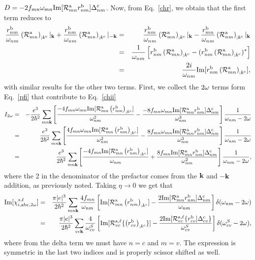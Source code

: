 \documentclass[floatfix,prb,aps,superscriptaddress,11pt,preprint]{revtex4}
\begin{document}
$D=-2f_{mn}\omega_{mn}\mathrm{Im}[{\cal  R}^{\mathrm{a}}_{mn}r^{\mathrm{b}}_{nm}]\Delta^{\mathrm{c}}_{nm}$.
 Now, from Eq.~\eqref{chr}, we obtain
that the first term reduces to
\begin{eqnarray}\label{chrn}
\frac{r^{\mathrm{b}}_{nm}}{\omega_{nm}}\left({\cal R}^{\mathrm{a}}_{mn}\right)_{;k^{\mathrm{c}}}|_{\mathbf{k}}
+
\frac{r^{\mathrm{b}}_{nm}}{\omega_{nm}}\left({\cal R}^{\mathrm{a}}_{mn}\right)_{;k^{\mathrm{c}}}|_{-\mathbf{k}}
&=&
\frac{r^{\mathrm{b}}_{nm}}{\omega_{nm}}\left({\cal R}^{\mathrm{a}}_{mn}\right)_{;k^{\mathrm{c}}}|_{\mathbf{k}}
-
\frac{r^{\mathrm{b}}_{mn}}{\omega_{nm}}\left({\cal R}^{\mathrm{a}}_{nm}\right)_{;k^{\mathrm{c}}}|_{\mathbf{k}}
\nonumber\\
&=&
\frac{1}{\omega_{nm}}\left[r^{\mathrm{b}}_{nm}\left({\cal R}^{\mathrm{a}}_{mn}\right)_{;k^{\mathrm{c}}}
-
(r^{\mathrm{b}}_{nm}\left({\cal R}^{\mathrm{a}}_{mn}\right)_{;k^{\mathrm{c}}})^*\right]
\nonumber\\
&=&
\frac{2i}{\omega_{nm}}\mathrm{Im}[r^{\mathrm{b}}_{nm}\left({\cal R}^{\mathrm{a}}_{mn}\right)_{;k^{\mathrm{c}}}]
,
\end{eqnarray}
with similar results for the other two terms. First, we collect the
$2\omega$ terms form Eq.~\eqref{pfi} that contribute to Eq.~\eqref{chii}
\begin{eqnarray}\label{2wchii}
I_{2\omega}&=&
-\frac{e^3}{2\hbar^2}\sum_{mn\mathbf{k}}
\left[
\frac{-4f_{mn}\omega_{mn}\mathrm{Im}[{\cal R}^{\mathrm{a}}_{mn}\left(r^{\mathrm{b}}_{nm}\right)_{;k^{\mathrm{c}}}]}{\omega^2_{nm}}
-
\frac{-8f_{mn}\omega_{mn}\mathrm{Im}[{\cal R}^{\mathrm{a}}_{mn}r^{\mathrm{b}}_{nm}]\Delta^{\mathrm{c}}_{nm}}{\omega^3_{nm}}
\right]\frac{1}{\omega_{nm}-2\omega}
\nonumber\\
&=&
\frac{e^3}{2\hbar^2}\sum_{mn\mathbf{k}}
\left[
\frac{4f_{mn}\omega_{mn}\mathrm{Im}[{\cal R}^{\mathrm{a}}_{mn}\left(r^{\mathrm{b}}_{nm}\right)_{;k^{\mathrm{c}}}]}{\omega^2_{nm}}
-
\frac{8f_{mn}\omega_{mn}\mathrm{Im}[{\cal R}^{\mathrm{a}}_{mn}r^{\mathrm{b}}_{nm}]\Delta^{\mathrm{c}}_{nm}}{\omega^3_{nm}}
\right]\frac{1}{\omega_{nm}-2\omega}
\nonumber\\
&=&
\frac{e^3}{2\hbar^2}\sum_{mn\mathbf{k}}
\left[
\frac{-4f_{mn}\mathrm{Im}[{\cal R}^{\mathrm{a}}_{mn}\left(r^{\mathrm{b}}_{nm}\right)_{;k^{\mathrm{c}}}]}{\omega_{nm}}
+
\frac{8f_{mn}\mathrm{Im}[{\cal R}^{\mathrm{a}}_{mn}r^{\mathrm{b}}_{nm}]\Delta^{\mathrm{c}}_{nm}}{\omega^2_{nm}}
\right]\frac{1}{\omega_{nm}-2\omega}
,
\end{eqnarray}
where the 2 in the denominator of the prefactor
comes from the $\mathbf{k}$ and $-\mathbf{k}$ addition, as previously noted.
Taking $\eta\to 0$ we get that
\begin{eqnarray}\label{imchi2w}
\mathrm{Im}[\chi_{i,\mathrm{a}\mathrm{b}\mathrm{c},2\omega}^{s,\ell}]
&=&
\frac{\pi|e|^3}{2\hbar^2}\sum_{mn\mathbf{k}}
\frac{4f_{mn}}{\omega_{nm}}
\left[
\mathrm{Im}[{\cal R}^{\mathrm{a}}_{mn}\left(r^{\mathrm{b}}_{nm}\right)_{;k^{\mathrm{c}}}]
-
\frac{2\mathrm{Im}[{\cal R}^{\mathrm{a}}_{mn}r^{\mathrm{b}}_{nm}]\Delta^{\mathrm{c}}_{nm}}{\omega_{nm}}
\right]\delta(\omega_{nm}-2\omega)
\nonumber \\
&=&
\frac{\pi|e|^3}{2\hbar^2}\sum_{vc\mathbf{k}}
\frac{4}{\omega^S_{cv}}
\left[
\mathrm{Im}[{\cal R}^{\mathrm{a},\ell}_{vc}\{\left(r^{\mathrm{b}}_{cv}\right)_{;k^{\mathrm{c}}}\}]
-
\frac{2\mathrm{Im}[{\cal R}^{\mathrm{a},\ell}_{vc}\{r^{\mathrm{b}}_{cv}]\Delta^{\mathrm{c}}_{cv}\}}{\omega^S_{cv}}
\right]\delta(\omega^S_{cv}-2\omega)
,
\end{eqnarray} 
where from the delta term we must have $n=c$ and $m=v$. The expression
is symmetric in the last two indices and is properly scissor shifted
as well. 
\end{document}
